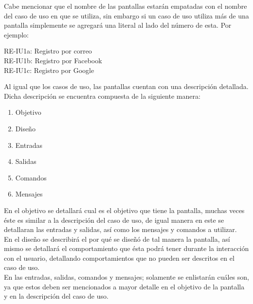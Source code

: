 Cabe mencionar que el nombre de las pantallas estarán empatadas con el nombre del caso de uso en que se utiliza, sin embargo si un caso de uso utiliza más de una pantalla simplemente se agregará una literal al lado del número de esta. Por ejemplo: 

\begin{center}
	RE-IU1a: Registro por correo\\
	RE-IU1b: Registro por Facebook\\
	RE-IU1c: Registro por Google\\
\end{center}

Al igual que los casos de uso, las pantallas cuentan con una descripción detallada. Dicha descripción se encuentra compuesta de la siguiente manera:

\begin{enumerate}
	\item Objetivo
	\item Diseño
	\item Entradas
	\item Salidas
	\item Comandos
	\item Mensajes
\end{enumerate}

En el objetivo se detallará cual es el objetivo que tiene la pantalla, muchas veces éste es similar a la descripción del caso de uso, de igual manera en este se detallaran las entradas y salidas, así como los mensajes y comandos a utilizar. \\

En el diseño se describirá el por qué se diseñó de tal manera la pantalla, así mismo se detallará el comportamiento que ésta podrá tener durante la interacción con el usuario, detallando comportamientos que no pueden ser descritos en el caso de uso.\\

En las entradas, salidas, comandos y mensajes; solamente se enlistarán cuáles son, ya que estos deben ser mencionados a mayor detalle en el objetivo de la pantalla y en la descripción del caso de uso.
